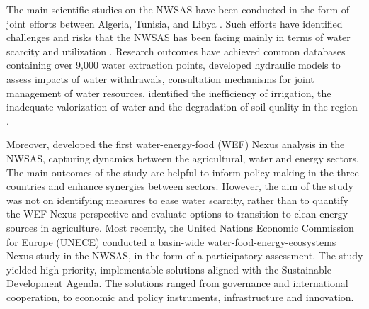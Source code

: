 The main scientific studies on the NWSAS have been conducted in the form of joint efforts between Algeria, Tunisia, and Libya \cite{abuzeidNorthWesternSahara2015}. Such efforts have identified challenges and risks that the NWSAS has been facing mainly in terms of water scarcity and utilization \cite{BetterValorizationIrrigation2015}. Research outcomes have achieved common databases containing over 9,000 water extraction points, developed hydraulic models to assess impacts of water withdrawals, consultation mechanisms for joint management of water resources, 
identified the inefficiency of irrigation, the inadequate valorization of water and the degradation of soil quality in the region \cite{khaterNorthWesternSahara2014,abuzeidNorthWesternSahara2015,BetterValorizationIrrigation2015,Socioeconomicaspectsirrigation2014}. 

Moreover, \citet{almullaNWSAS} developed the first  water-energy-food (WEF) Nexus analysis in the NWSAS, capturing dynamics between the agricultural, water and energy sectors. 
The main outcomes of the study are helpful to inform policy making in the three countries and enhance synergies between sectors. However, the aim of the study was not on identifying measures to ease water scarcity, rather than to quantify the WEF Nexus perspective and evaluate options to transition to clean energy sources in agriculture. Most recently, the United Nations Economic Commission for Europe (UNECE) \cite{uneceReconcilingResourceUses2020} conducted a basin-wide water-food-energy-ecosystems Nexus study in the NWSAS, in the form of a participatory assessment. The study yielded high-priority, implementable solutions aligned with the Sustainable Development Agenda. The solutions ranged from governance and international cooperation, to economic and policy instruments, infrastructure and innovation. 

